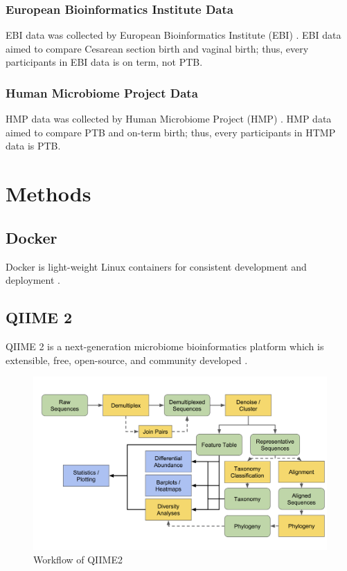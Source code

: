 \documentclass[a4paper]{article}
\begin{document}
            \subsubsection[EBI Data]{European Bioinformatics Institute Data}
                EBI data was collected by European Bioinformatics Institute (EBI) \cite{validate1}. EBI data aimed to compare Cesarean section birth and vaginal birth; thus, every participants in EBI data is on term, not PTB.

            \subsubsection[HMP Data]{Human Microbiome Project Data}
                HMP data was collected by Human Microbiome Project (HMP) \cite{validate2}. HMP data aimed to compare PTB and on-term birth; thus, every participants in HTMP data is PTB.

    \section{Methods}
        \subsection{Docker}
            Docker is light-weight Linux containers for consistent development and deployment \cite{docker1}.

        \subsection{QIIME 2}
            QIIME 2 is a next-generation microbiome bioinformatics platform which is extensible, free, open-source, and community developed \cite{qiime1, qiime2, qiime3}.

            \begin{figure}[p]
                \centering
                \includegraphics[width=0.6 \linewidth]{figures/qiime.png}
                \caption{Workflow of QIIME2}
                \label{fig:qiime2}
            \end{figure}
\end{document}
